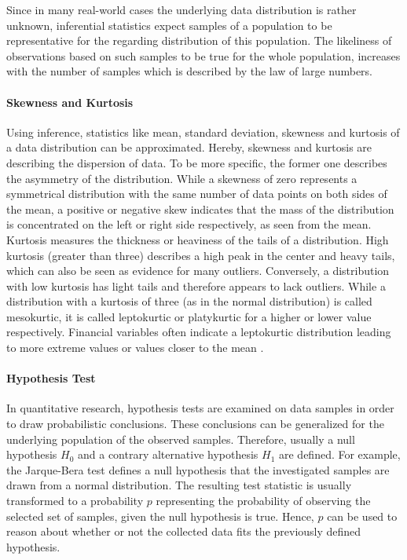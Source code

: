 
Since in many real-world cases the underlying data distribution is rather unknown, inferential statistics expect samples of a population to be representative for the regarding distribution of this population. The likeliness of observations based on such samples to be true for the whole population, increases with the number of samples which is described by the law of large numbers.

\paragraph{Skewness and Kurtosis}
Using inference, statistics like mean, standard deviation, skewness and kurtosis of a data distribution can be approximated. Hereby, skewness and kurtosis are describing the dispersion of data. To be more specific, the former one describes the asymmetry of the distribution. While a skewness of zero represents a symmetrical distribution with the same number of data points on both sides of the mean, a positive or negative skew indicates that the mass of the distribution is concentrated on the left or right side respectively, as seen from the mean. Kurtosis measures the thickness or heaviness of the tails of a distribution. High kurtosis (greater than three) describes a high peak in the center and heavy tails, which can also be seen as evidence for many outliers. Conversely, a distribution with low kurtosis has light tails and therefore appears to lack outliers. While a distribution with a kurtosis of three (as in the normal distribution) is called mesokurtic, it is called leptokurtic or platykurtic for a higher or lower value respectively. Financial variables often indicate a leptokurtic distribution leading to more extreme values or values closer to the mean \cite{Franke2010StatisticsMarkets}.


\paragraph{Hypothesis Test}
In quantitative research, hypothesis tests are examined on data samples in order to draw probabilistic conclusions. These conclusions can be generalized for the underlying population of the observed samples. Therefore, usually a null hypothesis $H_0$ and a contrary alternative hypothesis $H_1$ are defined. For example, the Jarque-Bera test \cite{Jarque1980EfficientResiduals} defines a null hypothesis that the investigated samples are drawn from a normal distribution. The resulting test statistic is usually transformed to a probability $p$ representing the probability of observing the selected set of samples, given the null hypothesis is true. Hence, $p$ can be used to reason about whether or not the collected data fits the previously defined hypothesis.

